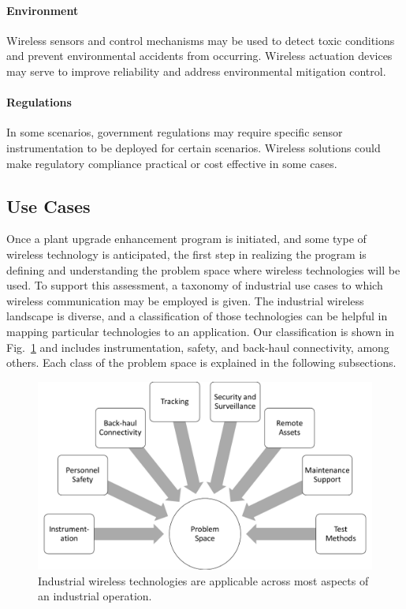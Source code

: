	\paragraph{Environment} Wireless sensors and control mechanisms may be used to detect toxic conditions and prevent environmental accidents from occurring.  Wireless actuation devices may serve to improve reliability and address environmental mitigation control. 
	\paragraph{Regulations} In some scenarios, government regulations may require specific sensor instrumentation to be deployed for certain scenarios.  Wireless solutions could make regulatory compliance practical or cost effective in some cases.
      
    \subsection{Use Cases}
    
    Once a plant upgrade enhancement program is initiated, and some type of wireless technology is anticipated, the first step in realizing the program is defining and understanding the problem space where wireless technologies will be used. To support this assessment, a taxonomy of industrial use cases to which wireless communication may be employed is given.  The industrial wireless landscape is diverse, and a classification of those technologies can be helpful in mapping particular technologies to an application.  Our classification is shown in Fig.~\ref{fig:problemspace} and includes instrumentation, safety, and back-haul connectivity, among others. Each class of the problem space is explained in the following subsections.  

\begin{figure}[t]
\centering
\includegraphics[width=\columnwidth]{./chapter-reswk/figs/probsp}
\caption{Industrial wireless technologies are applicable across most aspects of an industrial operation.}
\label{fig:problemspace}
\end{figure}   

